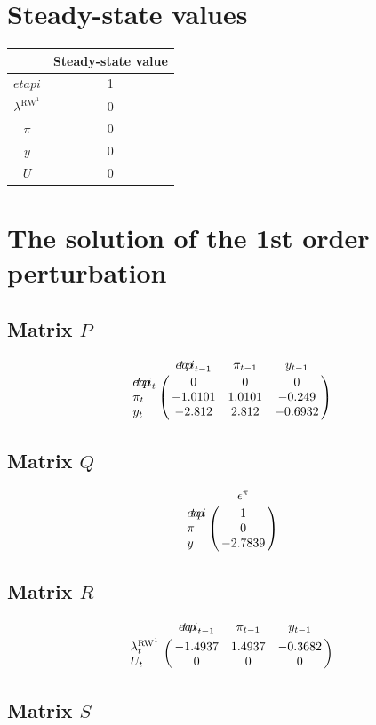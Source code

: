 

\section{Steady-state values}


\begin{tabular}{c|c|}
  & Steady-state value\\
\hline
${e\!t\!a\!p\!i}$ & 1 \\
$\lambda^{\mathrm{RW}^{\mathrm{1}}}$ & 0 \\
$\pi$ & 0 \\
$y$ & 0 \\
$U$ & 0 \\
\hline
\end{tabular}


\section{The solution of the 1st order perturbation}

\subsection*{Matrix $P$}

$$\bordermatrix{
~ & {e\!t\!a\!p\!i}_{t-1} & \pi_{t-1} & y_{t-1} \cr
{e\!t\!a\!p\!i}_{t} & 0 & 0 & 0 \cr
\pi_{t} & -1.0101 & 1.0101 & -0.249 \cr
y_{t} & -2.812 & 2.812 & -0.6932 \cr
}$$

\subsection*{Matrix $Q$}

$$\bordermatrix{
~ & \epsilon^{\pi} \cr
{e\!t\!a\!p\!i} & 1 \cr
\pi & 0 \cr
y & -2.7839 \cr
}$$

\subsection*{Matrix $R$}

$$\bordermatrix{
~ & {e\!t\!a\!p\!i}_{t-1} & \pi_{t-1} & y_{t-1} \cr
\lambda^{\mathrm{RW}^{\mathrm{1}}}_{t} & -1.4937 & 1.4937 & -0.3682 \cr
U_{t} & 0 & 0 & 0 \cr
}$$

\subsection*{Matrix $S$}

